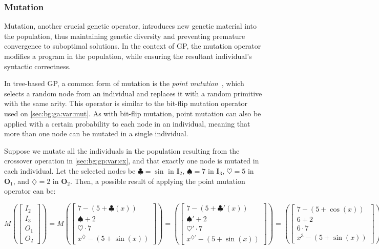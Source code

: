\subsubsection{Mutation}
\label{sec:bg:gp:variation:mutation}
  Mutation, another crucial genetic operator, introduces new genetic material 
  into the population, thus maintaining genetic diversity and preventing 
  premature convergence to suboptimal solutions.
  In the context of GP, the mutation operator modifies a program in the
  population, while ensuring the resultant individual's syntactic correctness.

  In tree-based GP, a common form of mutation is the \emph{point 
  mutation}~\autocite{poliFieldGuideGenetic2008a,wilhelmstotterJeneticsJavaGenetica},
  which selects a random node from an individual and replaces it with a random
  primitive with the same arity.
  This operator is similar to the bit-flip mutation operator used on 
  \vref{sec:bg:ga:var:mut}.
  As with bit-flip mutation, point mutation can also be applied with a certain
  probability to each node in an individual, meaning that more than one node
  can be mutated in a single individual.

  Suppose we mutate all the individuals in the population resulting from the
  crossover operation in \vref{sec:bg:gp:var:cx}, and that exactly
  one node is mutated in each individual.
  Let the selected nodes be \(\clubsuit = \sin\) in \(\mathbf{I}_2\),
  \(\spadesuit = 7\) in \(\mathbf{I}_3\), \(\heartsuit = 5\) in 
  \(\mathbf{O}_1\), and \(\diamondsuit = 2\) in \(\mathbf{O}_2\).
  Then, a possible result of applying the point mutation operator can be:

  \[
    M\!\left(
      \begin{bmatrix}
        I_2 \\ I_3 \\ O_1 \\ O_2
      \end{bmatrix}
    \right) = M\!\left(
      \begin{bmatrix}
        7 - (5 + \clubsuit(x)) \\
        \spadesuit + 2 \\
        \heartsuit \cdot 7 \\
        x^\diamondsuit - (5 + \sin(x))
      \end{bmatrix}
    \right) = \left(
      \begin{bmatrix}
        7 - (5 + \clubsuit'(x)) \\
        \spadesuit' + 2 \\
        \heartsuit' \cdot 7 \\
        x^{\diamondsuit'} - (5 + \sin(x))
      \end{bmatrix}
    \right) = \left(
      \begin{bmatrix}
        7 - (5 + \cos(x)) \\
        6 + 2 \\
        6 \cdot 7 \\
        x^3 - (5 + \sin(x))
      \end{bmatrix}
    \right)
  \]

